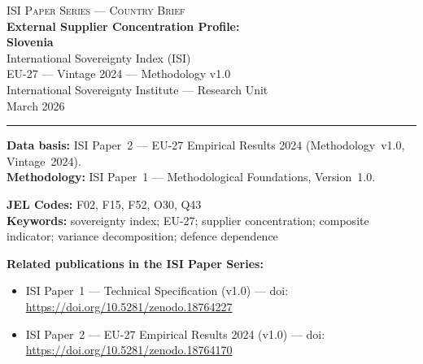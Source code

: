 \documentclass[12pt,a4paper]{article}
\begin{document}
\hypersetup{pageanchor=false}

\begin{titlepage}
\centering
\vspace*{2cm}
{\Large\textsc{ISI Paper Series --- Country Brief}}\\[1.2cm]
{\LARGE\bfseries External Supplier Concentration Profile:\\[0.3em]
Slovenia}\\[1.5cm]
{\large International Sovereignty Index (ISI)\\[0.3em]
EU-27 --- Vintage 2024 --- Methodology v1.0}\\[1.2cm]
{\large International Sovereignty Institute --- Research Unit}\\[0.8cm]
{\large March 2026}

\vspace{0.8cm}
\noindent\rule{\textwidth}{0.4pt}
\vspace{0.4cm}

\begin{flushleft}
\noindent\textbf{Data basis:} ISI Paper~2 --- EU-27 Empirical Results 2024 (Methodology~v1.0, Vintage~2024).\\[4pt]
\noindent\textbf{Methodology:} ISI Paper~1 --- Methodological Foundations, Version~1.0.

\medskip

\noindent\textbf{JEL Codes:} F02, F15, F52, O30, Q43\\[4pt]
\noindent\textbf{Keywords:} sovereignty index; EU-27; supplier concentration; composite indicator; variance decomposition; defence dependence

\medskip

\noindent\textbf{Related publications in the ISI Paper Series:}
\begin{itemize}[nosep,leftmargin=1.5em]
\item ISI Paper~1 --- Technical Specification (v1.0) --- doi:\\
  \url{https://doi.org/10.5281/zenodo.18764227}
\item ISI Paper~2 --- EU-27 Empirical Results 2024 (v1.0) --- doi:\\
  \url{https://doi.org/10.5281/zenodo.18764170}
\end{itemize}
\end{flushleft}
\vfill
\end{titlepage}
\end{document}
